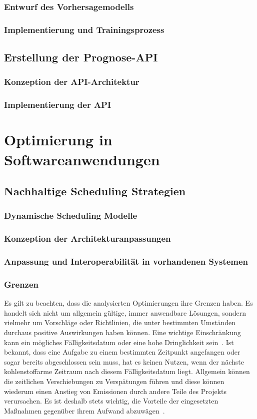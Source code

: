 \subsection{Entwurf des Vorhersagemodells}
\subsection{Implementierung und Trainingsprozess}
\section{Erstellung der Prognose-API}
\subsection{Konzeption der API-Architektur}
\subsection{Implementierung der API}

\chapter{Optimierung in Softwareanwendungen}
\section{Nachhaltige Scheduling Strategien}
\subsection{Dynamische Scheduling Modelle}
\subsection{Konzeption der Architekturanpassungen}
\subsection{Anpassung und Interoperabilität in vorhandenen Systemen}
\subsection{Grenzen}
Es gilt zu beachten, dass die analysierten Optimierungen ihre Grenzen haben.
Es handelt sich nicht um allgemein gültige, immer anwendbare Lösungen, sondern vielmehr um Vorschläge oder Richtlinien, die unter bestimmten Umständen durchaus positive Auswirkungen haben können.
Eine wichtige Einschränkung kann ein mögliches Fälligkeitsdatum oder eine hohe Dringlichkeit sein~\cite{Dodge.06212022}.
Ist bekannt, dass eine Aufgabe zu einem bestimmten Zeitpunkt angefangen oder sogar bereits abgeschlossen sein muss, hat es keinen Nutzen, wenn der nächste kohlenstoffarme Zeitraum nach diesem Fälligkeitsdatum liegt.
Allgemein können die zeitlichen Verschiebungen zu Verspätungen führen und diese können wiederum einen Anstieg von Emissionen durch andere Teile des Projekts verursachen.
Es ist deshalb stets wichtig, die Vorteile der eingesetzten Maßnahmen gegenüber ihrem Aufwand abzuwägen~\cite{Dodge.06212022}.
